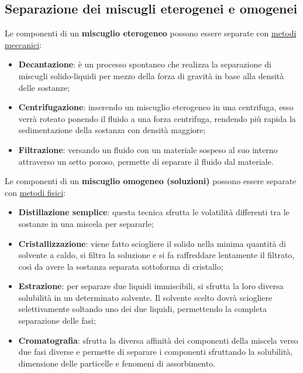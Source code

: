 \documentclass{article}
\begin{document}
\subsection{Separazione dei miscugli eterogenei e omogenei}
    Le componenti di un \textbf{miscuglio eterogeneo} possono essere separate con \underline{metodi meccanici}:
        \begin{itemize}
            \item \textbf{Decantazione}: è un processo spontaneo che realizza la separazione di miscugli
                solido-liquidi per mezzo della forza di gravità in base alla densità delle sostanze;
            \item \textbf{Centrifugazione}: inserendo un miscuglio eterogeneo in una centrifuga, esso
                verrà roteato ponendo il fluido a una forza centrifuga, rendendo più rapida la
                sedimentazione della sostanza con densità maggiore; 
            \item \textbf{Filtrazione}: versando un fluido con un materiale sospeso al suo interno attraverso
                un setto poroso, permette di separare il fluido dal materiale.
        \end{itemize}
    Le componenti di un \textbf{miscuglio omogeneo (soluzioni)} possono essere separate con \underline{metodi fisici}:
        \begin{itemize}
            \item \textbf{Distillazione semplice}: questa tecnica sfrutta le volatilità differenti
                tra le sostanze in una miscela per separarle;
            \item \textbf{Cristallizzazione}: viene fatto sciogliere il solido nella minima quantità di
                solvente a caldo, si filtra la soluzione e si fa raffreddare lentamente il filtrato,
                così da avere la sostanza separata sottoforma di cristallo;
            \item \textbf{Estrazione}: per separare due liquidi immiscibili, si sfrutta la loro diversa
                solubilità in un determinato solvente. Il solvente scelto dovrà sciogliere selettivamente
                soltando uno dei due liquidi, permettendo la completa separazione delle fasi;
            \item \textbf{Cromatografia}: sfrutta la diversa affinità dei componenti della miscela
                verso due fasi diverse e permette di separare i componenti sfruttando la solubilità,
                dimensione delle particelle e fenomeni di assorbimento.
            \end{itemize}
\end{document}
